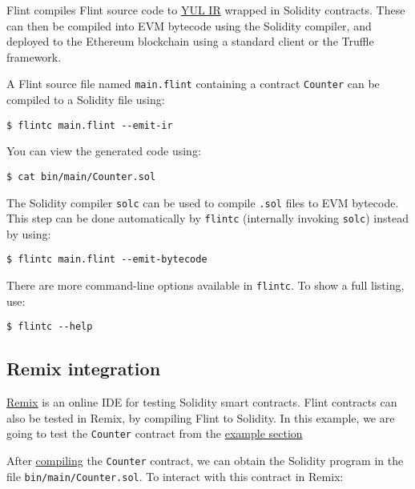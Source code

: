 Flint compiles Flint source code to \href{https://solidity.readthedocs.io/en/latest/yul.html}{YUL IR} wrapped in Solidity contracts. These can then be compiled into EVM bytecode using the Solidity compiler, and deployed to the Ethereum blockchain using a standard client or the Truffle framework.

A Flint source file named \texttt{main.flint} containing a contract \texttt{Counter} can be compiled to a Solidity file using:

\begin{verbatim}
$ flintc main.flint --emit-ir
\end{verbatim}

You can view the generated code using:

\begin{verbatim}
$ cat bin/main/Counter.sol
\end{verbatim}

The Solidity compiler \texttt{solc} can be used to compile \texttt{.sol} files to EVM bytecode. This step can be done automatically by \texttt{flintc} (internally invoking \texttt{solc}) instead by using:

\begin{verbatim}
$ flintc main.flint --emit-bytecode
\end{verbatim}

There are more command-line options available in \texttt{flintc}. To show a full listing, use:

\begin{verbatim}
$ flintc --help
\end{verbatim}

\subsection{Remix integration}
\label{sec:appendix-b-remix-integration}

\href{https://remix.ethereum.org/}{Remix} is an online IDE for testing Solidity smart contracts. Flint contracts can also be tested in Remix, by compiling Flint to Solidity. In this example, we are going to test the \texttt{Counter} contract from the \hyperref[sec:appendix-b-example]{example section}

After \hyperref[sec:appendix-b-compilation]{compiling} the \texttt{Counter} contract, we can obtain the Solidity program in the file \texttt{bin/main/Counter.sol}. To interact with this contract in Remix:

